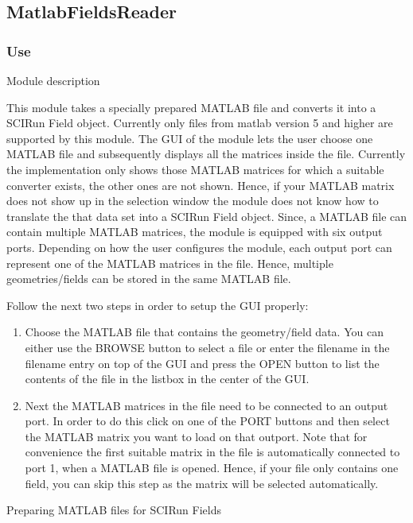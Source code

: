 \subsection{MatlabFieldsReader}
\subsubsection*{Use}
Module description


	This module takes a specially prepared MATLAB file and converts it into a SCIRun Field object. Currently only files from matlab version 5
	and higher are supported by this module. The GUI of the module lets the user choose one MATLAB file and subsequently displays all the matrices
	inside the file. Currently the implementation only shows those MATLAB matrices for which a suitable converter exists, the other ones are not
	shown. Hence, if your MATLAB matrix does not show up in the selection window the module does not know how to translate the that data set 
	into a SCIRun Field object. 
	Since, a MATLAB file can contain multiple MATLAB matrices, the module is equipped with six output ports. Depending on how the user configures the 
	module, each output port can represent one of the MATLAB matrices in the file. Hence, multiple geometries/fields can be stored in the same MATLAB
	file. 
	



 Follow the next two steps in order to setup the GUI properly: 


\begin{enumerate}

\item 
		Choose the MATLAB file that contains the geometry/field data. You can either use the BROWSE button to select a file or enter the filename in the 
		filename entry on top of the GUI and press the OPEN button to list the contents of the file in the listbox in the center of the GUI.
		
\item 
		Next the MATLAB matrices in the file need to be connected to an output port. In order to do this click on one of the PORT buttons and then
		select the MATLAB matrix you want to load on that outport. Note that for convenience the first suitable matrix in the file is automatically 
		connected to port 1, when a MATLAB file is opened. Hence, if your file only contains one field, you can skip this step 
		as the matrix will be selected automatically. 
		
\end{enumerate}
 Preparing MATLAB files for SCIRun Fields 


